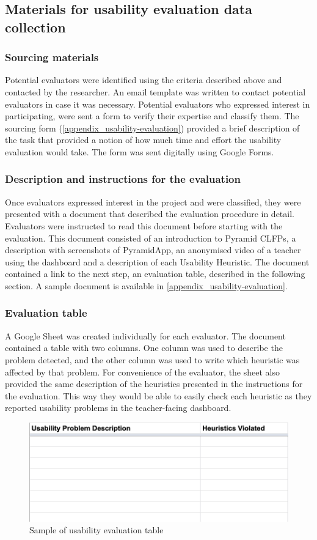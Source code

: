 \subsection{Materials for usability evaluation data collection} \label{materials_usability}
\subsubsection{Sourcing materials}
Potential evaluators were identified using the criteria described above and contacted by the researcher. An email template was written to contact potential evaluators in case it was necessary. Potential evaluators who expressed interest in participating, were sent a form to verify their expertise and classify them.
The sourcing form (\ref{appendix_usability-evaluation}) provided a brief description of the task that provided a notion of how much time and effort the usability evaluation would take. The form was sent digitally using Google Forms. 
\subsubsection{Description and instructions for the evaluation}
Once evaluators expressed interest in the project and were classified, they were presented with a document that described the evaluation procedure in detail. Evaluators were instructed to read this document before starting with the evaluation. This document consisted of an introduction to Pyramid CLFPs, a description with screenshots of PyramidApp, an anonymised video of a teacher using the dashboard and a description of each Usability Heuristic. The document contained a link to the next step, an evaluation table, described in the following section. A sample document is available in \ref{appendix_usability-evaluation}.
\subsubsection{Evaluation table}
A Google Sheet was created individually for each evaluator. The document contained a table with two columns. One column was used  to describe the problem detected, and the other column was used to write which heuristic was affected by that problem. For convenience of the evaluator, the sheet also provided the same description of the heuristics presented in the instructions for the evaluation. This way they would be able to easily check each heuristic as they reported usability problems in the teacher-facing dashboard.
\begin{figure}[!h]
    \includegraphics[clip,width=\columnwidth]{Figures/evaluation_table.png} 
\caption{Sample of usability evaluation table}
\label{fig:table-screenshot}
\end{figure}
